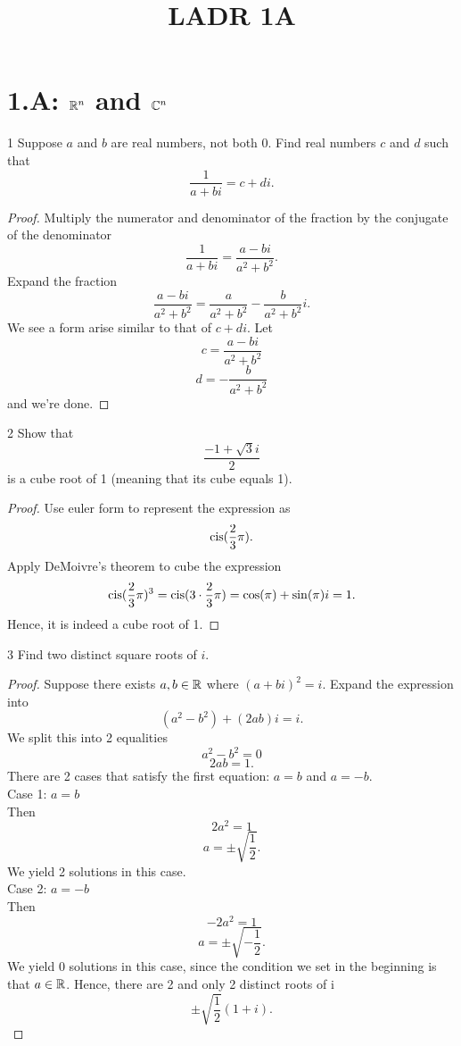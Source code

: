 \documentclass[12pt, letterpaper]{article}
\title{LADR 1A}
\begin{document}
\maketitle

\section*{1.A: $\mathbb{R}^n$ and $\mathbb{C}^n$}

\begin{problem}{1}
Suppose $a$ and $b$ are real numbers, not both 0. Find real numbers $c$ and
$d$ such that
$${\frac{1}{a+bi}}=c+di.$$
\end{problem}

\begin{proof}
Multiply the numerator and denominator of the fraction by the conjugate of the denominator
$$\frac{1}{a+bi} = \frac{a-bi}{a^2+b^2}.$$
Expand the fraction
$$\frac{a-bi}{a^2+b^2} = \frac{a}{a^2+b^2} - \frac{b}{a^2+b^2}i.$$
We see a form arise similar to that of ${c+di}$. Let
$$c = \frac{a-bi}{a^2+b^2}$$
$$d = -\frac{b}{a^2+b^2}$$
and we're done.
\end{proof}

\begin{problem}{2}
Show that
$$\frac{-1+\sqrt{3}i}{2}$$
is a cube root of 1 (meaning that its cube equals 1).
\end{problem}

\begin{proof}
Use euler form to represent the expression as
$$\operatorname{cis}(\frac{2}{3}\pi).$$
Apply DeMoivre's theorem to cube the expression
$$\operatorname{cis}(\frac{2}{3}\pi)^3 = \operatorname{cis}(3\cdot\frac{2}{3}\pi) = \cos(\pi) + \sin(\pi)i = 1.$$
Hence, it is indeed a cube root of 1.
\end{proof}

\begin{problem}{3}
Find two distinct square roots of $i$.
\end{problem}

\begin{proof}
Suppose there exists $a,b\in\mathbb{R}$ where $(a+bi)^2 = i$. Expand the expression into
$$(a^2-b^2)+(2ab)i = i.$$
We split this into 2 equalities
$$a^2-b^2=0$$
$$2ab = 1.$$
There are 2 cases that satisfy the first equation: $a = b$ and $a = -b$.
\\Case 1: $a=b$
\\Then
$$2a^2 = 1$$
$$a = \pm\sqrt{\frac{1}{2}}.$$
We yield 2 solutions in this case.
\\Case 2: $a=-b$
\\Then
$$-2a^2 = 1$$
$$a = \pm\sqrt{-\frac{1}{2}}.$$
We yield 0 solutions in this case, since the condition we set in the beginning is that $a\in\mathbb{R}$.
Hence, there are 2 and only 2 distinct roots of i
$$\pm\sqrt{\frac{1}{2}}(1+i).$$
\end{proof}
\end{document}

